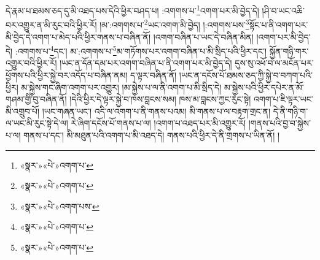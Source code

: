 དེ་རྣམ་པ་ཐམས་ཅད་དུ་མི་འཐད་པས་དེའི་ཕྱིར་བཤད་པ། :འགགས་པ་\footnote{«སྣར་»«པེ་»འགག་པ་}འགག་པར་མི་བྱེད་དེ། །ཤི་བ་ཡང་འཆི་བར་འགྱུར་ན་མི་རུང་བའི་ཕྱིར་རོ། །མ་:འགགས་པ་\footnote{«སྣར་»«པེ་»འགག་པ་}ཡང་འགག་མི་བྱེད། །:འགགས་པས་\footnote{«སྣར་»«པེ་»འགག་པས་}སྟོང་པ་ནི་འགག་པར་མི་བྱེད་དེ་འགག་པ་མེད་པའི་ཕྱིར་གནས་པ་བཞིན་ནོ། །འགག་བཞིན་པ་ཡང་དེ་བཞིན་མིན། །འགག་པར་མི་བྱེད་དེ། :འགགས་པ་\footnote{«སྣར་»«པེ་»འགག་པ་}དང་། མ་:འགགས་པ་\footnote{«སྣར་»«པེ་»འགག་པ་}མ་གཏོགས་པར་འགག་བཞིན་པ་མི་སྲིད་པའི་ཕྱིར་དང་། སྐྱོན་གཉི་གར་འགྱུར་བའི་ཕྱིར་རོ། །ཡང་ན་དོན་དམ་པར་འགག་བཞིན་པ་ནི་འགག་པར་མི་བྱེད་དེ། དུས་སུ་འཕོ་བ་ལ་མངོན་པར་ཕྱོགས་པའི་ཕྱིར་སྐྱེ་བར་འདོད་པ་བཞིན་ནམ། ད་ལྟར་བཞིན་ནོ། །ཡང་ན་དངོས་པོ་ཐམས་ཅད་ཀྱི་སྐྱེ་བ་བཀག་པའི་ཕྱིར། མ་སྐྱེས་གང་ཞིག་འགག་པར་འགྱུར། །མ་སྐྱེས་པ་ལ་ནི་འགག་པ་མི་སྲིད་དེ། མ་སྐྱེས་པའི་ཕྱིར་དཔེར་ན་མོ་གཤམ་གྱི་བུ་བཞིན་ནོ། །དེའི་ཕྱིར་དེ་ལྟར་སྐྱེ་བ་ཁས་བླངས་སམ། ཁས་མ་བླངས་ཀྱང་རུང་སྟེ། འགག་པ་ཇི་ལྟར་ཡང་མི་འགྲུབ་པོ། །ཡང་གཞན་ཡང་། འདི་ལ་འགག་པ་ནི་གནས་པའམ། མི་གནས་པ་ལ་བརྟག་གྲང་ན། དེ་ནི་གཉི་ག་ལ་ཡང་མི་རུང་སྟེ་དེ་ལ། རེ་ཞིག་དངོས་པོ་གནས་པ་ལ། །འགག་པ་འཐད་པར་མི་འགྱུར་རོ། །གནས་པའི་བྱ་བ་སྐྱེས་པ་ལ། གནས་པ་དང་། མི་མཐུན་པའི་འགག་པ་མི་འཐད་དེ། གནས་པའི་ཕྱིར་དེ་ནི་གྲགས་པ་ཡིན་ནོ། །
